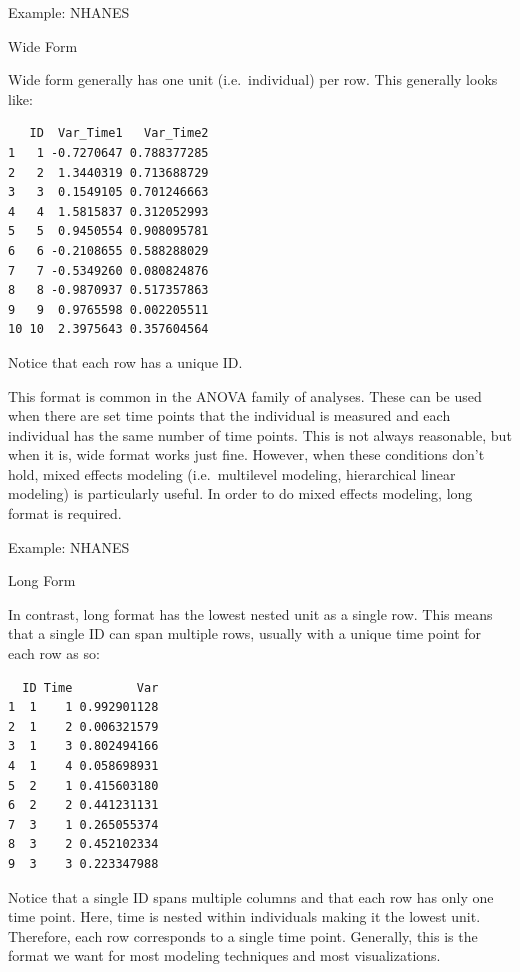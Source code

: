 \begin{frame}[fragile]{Example: NHANES}

\begin{block}{Wide Form}

Wide form generally has one unit (i.e.~individual) per row. This
generally looks like:

\begin{verbatim}
   ID  Var_Time1   Var_Time2
1   1 -0.7270647 0.788377285
2   2  1.3440319 0.713688729
3   3  0.1549105 0.701246663
4   4  1.5815837 0.312052993
5   5  0.9450554 0.908095781
6   6 -0.2108655 0.588288029
7   7 -0.5349260 0.080824876
8   8 -0.9870937 0.517357863
9   9  0.9765598 0.002205511
10 10  2.3975643 0.357604564
\end{verbatim}

Notice that each row has a unique ID.

This format is common in the ANOVA family of analyses. These can be used
when there are set time points that the individual is measured and each
individual has the same number of time points. This is not always
reasonable, but when it is, wide format works just fine. However, when
these conditions don't hold, mixed effects modeling (i.e.~multilevel
modeling, hierarchical linear modeling) is particularly useful. In order
to do mixed effects modeling, long format is required.

\end{block}

\end{frame}

\begin{frame}[fragile]{Example: NHANES}

\begin{block}{Long Form}

In contrast, long format has the lowest nested unit as a single row.
This means that a single ID can span multiple rows, usually with a
unique time point for each row as so:

\begin{verbatim}
  ID Time         Var
1  1    1 0.992901128
2  1    2 0.006321579
3  1    3 0.802494166
4  1    4 0.058698931
5  2    1 0.415603180
6  2    2 0.441231131
7  3    1 0.265055374
8  3    2 0.452102334
9  3    3 0.223347988
\end{verbatim}

Notice that a single ID spans multiple columns and that each row has
only one time point. Here, time is nested within individuals making it
the lowest unit. Therefore, each row corresponds to a single time point.
Generally, this is the format we want for most modeling techniques and
most visualizations.

\end{block}

\end{frame}

